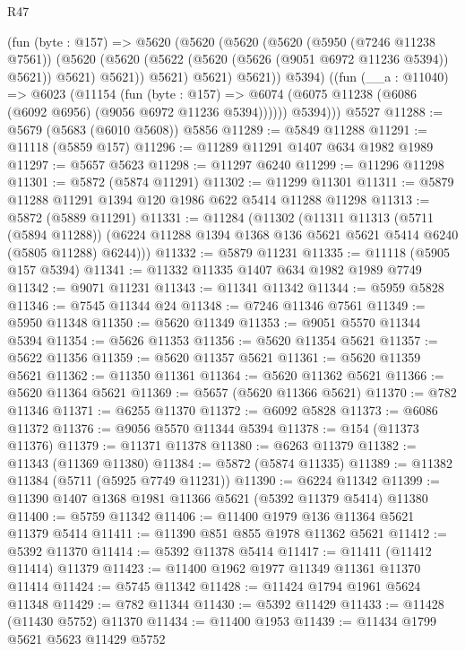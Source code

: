 \begin{lexlean}{R47}
\begin{coremodule}
          (fun (byte : @157) =>
          @5620
            (@5620
              (@5620
                (@5620
                  (@5950 (@7246 @11238 @7561))
                  (@5620
                    (@5620 (@5622 (@5620 (@5626 (@9051 @6972 @11236 @5394)) @5621)) @5621)
                    @5621))
                @5621)
              @5621)
            @5621))
          @5394)
        ((fun (__a : @11040) =>
        @6023
          (@11154
            (fun (byte : @157) =>
            @6074 (@6075 @11238 (@6086 (@6092 @6956) (@9056 @6972 @11236 @5394))))))
          @5394)))
    @5527
@11288 := @5679 (@5683 (@6010 @5608)) @5856
@11289 := @5849 @11288
@11291 := @11118 (@5859 @157)
@11296 := @11289 @11291 @1407 @634 @1982 @1989
@11297 := @5657 @5623
@11298 := @11297 @6240
@11299 := @11296 @11298
@11301 := @5872 (@5874 @11291)
@11302 := @11299 @11301
@11311 := @5879 @11288 @11291 @1394 @120 @1986 @622 @5414 @11288 @11298
@11313 := @5872 (@5889 @11291)
@11331 := @11284
    (@11302
      (@11311
        @11313
        (@5711 (@5894 @11288))
        (@6224 @11288 @1394 @1368 @136 @5621 @5621 @5414 @6240 (@5805 @11288) @6244)))
@11332 := @5879 @11231
@11335 := @11118 (@5905 @157 @5394)
@11341 := @11332 @11335 @1407 @634 @1982 @1989 @7749
@11342 := @9071 @11231
@11343 := @11341 @11342
@11344 := @5959 @5828
@11346 := @7545 @11344 @24
@11348 := @7246 @11346 @7561
@11349 := @5950 @11348
@11350 := @5620 @11349
@11353 := @9051 @5570 @11344 @5394
@11354 := @5626 @11353
@11356 := @5620 @11354 @5621
@11357 := @5622 @11356
@11359 := @5620 @11357 @5621
@11361 := @5620 @11359 @5621
@11362 := @11350 @11361
@11364 := @5620 @11362 @5621
@11366 := @5620 @11364 @5621
@11369 := @5657 (@5620 @11366 @5621)
@11370 := @782 @11346
@11371 := @6255 @11370
@11372 := @6092 @5828
@11373 := @6086 @11372
@11376 := @9056 @5570 @11344 @5394
@11378 := @154 (@11373 @11376)
@11379 := @11371 @11378
@11380 := @6263 @11379
@11382 := @11343 (@11369 @11380)
@11384 := @5872 (@5874 @11335)
@11389 := @11382 @11384 (@5711 (@5925 @7749 @11231))
@11390 := @6224 @11342
@11399 := @11390 @1407 @1368 @1981 @11366 @5621 (@5392 @11379 @5414) @11380
@11400 := @5759 @11342
@11406 := @11400 @1979 @136 @11364 @5621 @11379 @5414
@11411 := @11390 @851 @855 @1978 @11362 @5621
@11412 := @5392 @11370
@11414 := @5392 @11378 @5414
@11417 := @11411 (@11412 @11414) @11379
@11423 := @11400 @1962 @1977 @11349 @11361 @11370 @11414
@11424 := @5745 @11342
@11428 := @11424 @1794 @1961 @5624 @11348
@11429 := @782 @11344
@11430 := @5392 @11429
@11433 := @11428 (@11430 @5752) @11370
@11434 := @11400 @1953
@11439 := @11434 @1799 @5621 @5623 @11429 @5752

\end{coremodule}
\end{lexlean}

